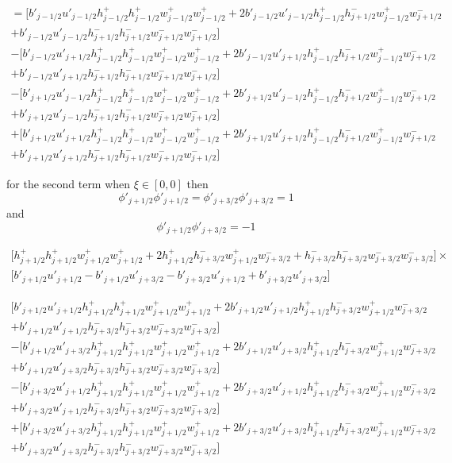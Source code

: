\documentclass[12pt]{article}
\begin{document}
\begin{multline*}
=\bigg[b'_{j-1/2}u'_{j-1/2} h^+_{j-1/2}h^+_{j-1/2} w^+_{j-1/2}w^+_{j-1/2}  + 2b'_{j-1/2}u'_{j-1/2}h^+_{j-1/2}h^-_{j+1/2} w^+_{j-1/2} w^-_{j+1/2} \\+ b'_{j-1/2}u'_{j-1/2}h^-_{j+1/2}h^-_{j+1/2} w^-_{j+1/2}w^-_{j+1/2}\bigg] \\- \bigg[ b'_{j-1/2}u'_{j+1/2}h^+_{j-1/2}h^+_{j-1/2} w^+_{j-1/2}w^+_{j-1/2}  + 2b'_{j-1/2}u'_{j+1/2}h^+_{j-1/2}h^-_{j+1/2} w^+_{j-1/2} w^-_{j+1/2} \\ + b'_{j-1/2}u'_{j+1/2}h^-_{j+1/2}h^-_{j+1/2} w^-_{j+1/2}w^-_{j+1/2}\bigg] \\- \bigg[ b'_{j+1/2} u'_{j-1/2}h^+_{j-1/2}h^+_{j-1/2} w^+_{j-1/2}w^+_{j-1/2}  + 2b'_{j+1/2} u'_{j-1/2}h^+_{j-1/2}h^-_{j+1/2} w^+_{j-1/2} w^-_{j+1/2} \\+ b'_{j+1/2} u'_{j-1/2}h^-_{j+1/2}h^-_{j+1/2} w^-_{j+1/2}w^-_{j+1/2}\bigg]\\+ \bigg[ b'_{j+1/2}u'_{j+1/2}h^+_{j-1/2}h^+_{j-1/2} w^+_{j-1/2}w^+_{j-1/2}  + 2b'_{j+1/2}u'_{j+1/2}h^+_{j-1/2}h^-_{j+1/2} w^+_{j-1/2} w^-_{j+1/2} \\+ b'_{j+1/2}u'_{j+1/2}h^-_{j+1/2}h^-_{j+1/2} w^-_{j+1/2}w^-_{j+1/2}\bigg]
\end{multline*}

for the second term when $\xi \in [0,0]$ then
\[\phi'_{j+1/2} \phi'_{j+1/2} = \phi'_{j+3/2} \phi'_{j+3/2}  =1\]
and
\[\phi'_{j+1/2} \phi'_{j+3/2} = -1\]

\begin{multline*}
\bigg[h^+_{j+1/2}h^+_{j+1/2} w^+_{j+1/2}w^+_{j+1/2}+ 2h^+_{j+1/2}h^-_{j+3/2} w^+_{j+1/2} w^-_{j+3/2} + h^-_{j+3/2}h^-_{j+3/2} w^-_{j+3/2}w^-_{j+3/2}\bigg] \times\\\big[ b'_{j+1/2}u'_{j+1/2}  -   b'_{j+1/2}u'_{j+3/2} -  b'_{j+3/2} u'_{j+1/2}  +  b'_{j+3/2} u'_{j+3/2}   \big] 
\end{multline*}


\begin{multline*}
\bigg[b'_{j+1/2}u'_{j+1/2} h^+_{j+1/2}h^+_{j+1/2} w^+_{j+1/2}w^+_{j+1/2}+ 2b'_{j+1/2}u'_{j+1/2} h^+_{j+1/2}h^-_{j+3/2} w^+_{j+1/2} w^-_{j+3/2} \\+ b'_{j+1/2}u'_{j+1/2} h^-_{j+3/2}h^-_{j+3/2} w^-_{j+3/2}w^-_{j+3/2}\bigg] \\- \bigg[b'_{j+1/2}u'_{j+3/2}h^+_{j+1/2}h^+_{j+1/2} w^+_{j+1/2}w^+_{j+1/2}+ 2b'_{j+1/2}u'_{j+3/2}h^+_{j+1/2}h^-_{j+3/2} w^+_{j+1/2} w^-_{j+3/2} \\+ b'_{j+1/2}u'_{j+3/2}h^-_{j+3/2}h^-_{j+3/2} w^-_{j+3/2}w^-_{j+3/2}\bigg] \\- \bigg[b'_{j+3/2} u'_{j+1/2}h^+_{j+1/2}h^+_{j+1/2} w^+_{j+1/2}w^+_{j+1/2}+ 2b'_{j+3/2} u'_{j+1/2}h^+_{j+1/2}h^-_{j+3/2} w^+_{j+1/2} w^-_{j+3/2} \\+ b'_{j+3/2} u'_{j+1/2}h^-_{j+3/2}h^-_{j+3/2} w^-_{j+3/2}w^-_{j+3/2}\bigg] \\+ \bigg[b'_{j+3/2} u'_{j+3/2}h^+_{j+1/2}h^+_{j+1/2} w^+_{j+1/2}w^+_{j+1/2}+ 2b'_{j+3/2} u'_{j+3/2}h^+_{j+1/2}h^-_{j+3/2} w^+_{j+1/2} w^-_{j+3/2} \\+ b'_{j+3/2} u'_{j+3/2}h^-_{j+3/2}h^-_{j+3/2} w^-_{j+3/2}w^-_{j+3/2}\bigg] 
\end{multline*}
\end{document}
